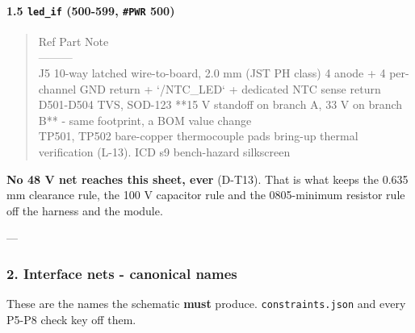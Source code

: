 \documentclass[11pt,a4paper]{article}
\begin{document}
\paragraph*{1.5 \texttt{led\_if} (500-599, \texttt{\#PWR} 500)}
\begin{quote}\small\ttfamily\raggedright
\textbar{} Ref \textbar{} Part \textbar{} Note \textbar{}\\
\textbar{}---\textbar{}---\textbar{}---\textbar{}\\
\textbar{} J5 \textbar{} 10-way latched wire-to-board, 2.0 mm (JST PH class) \textbar{} 4 anode + 4 per-channel GND return + `/NTC\_LED` + dedicated NTC sense return \textbar{}\\
\textbar{} D501-D504 \textbar{} TVS, SOD-123 \textbar{} {*}{*}15 V standoff on branch A, 33 V on branch B{*}{*} - same footprint, a BOM value change \textbar{}\\
\textbar{} TP501, TP502 \textbar{} bare-copper thermocouple pads \textbar{} bring-up thermal verification (L-13). ICD s9 bench-hazard silkscreen \textbar{}
\end{quote}
\textbf{No 48 V net reaches this sheet, ever} (D-T13). That is what keeps the 0.635 mm clearance rule, the 100 V capacitor rule and the 0805-minimum resistor rule off the harness and the module.

---

\subsubsection*{2. Interface nets - canonical names}
These are the names the schematic \textbf{must} produce. \texttt{constraints.json} and every P5-P8 check key off them.
\end{document}

